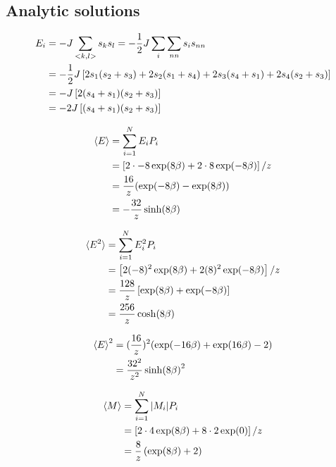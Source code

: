 
\begin{appendices}

\section{Analytic solutions}
\label{app:analytic}


\begin{align*}
  E_i &= -J \sum_{<k,l>} s_k s_l = -\frac{1}{2}J \sum_{i} \sum_{nn} s_i s_{nn} \\
      &= -\frac{1}{2} J \left[2 s_1 (s_2 + s_3) + 2s_2(s_1 + s_4) + 2s_3(s_4 + s_1) + 2s_4 (s_2 + s_3)\right]\\
      &= -J\left[ 2(s_4 + s_1)(s_2 + s_3)\right] \\
      &= -2J\left[(s_4 + s_1)(s_2+s_3)\right]
\end{align*}


\begin{align}
  \braket{E} &= \sum_{i=1}^{N} E_i P_i \\
             &= \left[2 \cdot -8 \exp(8\beta) + 2\cdot 8 \exp(-8\beta)\right] / z \\
             &= \frac{16}{z} ( \exp(-8\beta) - \exp(8\beta)) \\
             &= -\frac{32}{z} \sinh(8\beta)
\end{align}


\begin{align}
  \braket{E^2} &= \sum_{i=1}^{N} E_i^2 P_i \\
                &= \left[ 2 (-8)^2\exp(8\beta) + 2 (8)^2\exp(-8\beta) \right] /z \\
                &= \frac{128}{z}\left[ \exp(8 \beta) + \exp(-8\beta)\right] \\
                &= \frac{256}{z} \cosh(8\beta)
\end{align}

\begin{align}
  \braket{E}^2 &= (\frac{16}{z})^2 ( \exp(-16\beta) + \exp(16\beta) - 2) \\
               &= \frac{32^2}{z^2} \sinh(8\beta)^2
\end{align}

\begin{align}
  \braket{M} &= \sum_{i=1}^{N} \abs{M_i} P_i \\
             &= \left[2\cdot 4 \exp(8\beta ) + 8 \cdot 2 \exp(0)\right] / z \\
             &= \frac{8}{z} \left( \exp(8\beta) + 2\right)
\end{align}



\end{appendices}
